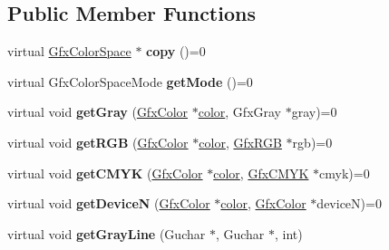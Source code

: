 \subsection*{Public Member Functions}
\begin{DoxyCompactItemize}
\item 
\mbox{\label{class_gfx_color_space_ab9b445e9acc594640393e17e27e4cf5c}} 
virtual \hyperlink{class_gfx_color_space}{Gfx\+Color\+Space} $\ast$ {\bfseries copy} ()=0
\item 
\mbox{\label{class_gfx_color_space_a4559405ac922360f73a0d06ce05ca623}} 
virtual Gfx\+Color\+Space\+Mode {\bfseries get\+Mode} ()=0
\item 
\mbox{\label{class_gfx_color_space_a76c3d1987b9328cfeeab349dfb8eddaa}} 
virtual void {\bfseries get\+Gray} (\hyperlink{struct_gfx_color}{Gfx\+Color} $\ast$\hyperlink{structcolor}{color}, Gfx\+Gray $\ast$gray)=0
\item 
\mbox{\label{class_gfx_color_space_a75622e2b5bdc720d5a13af5abeb9d93a}} 
virtual void {\bfseries get\+R\+GB} (\hyperlink{struct_gfx_color}{Gfx\+Color} $\ast$\hyperlink{structcolor}{color}, \hyperlink{struct_gfx_r_g_b}{Gfx\+R\+GB} $\ast$rgb)=0
\item 
\mbox{\label{class_gfx_color_space_af7bf579a6b33d40f3581224a32358c1a}} 
virtual void {\bfseries get\+C\+M\+YK} (\hyperlink{struct_gfx_color}{Gfx\+Color} $\ast$\hyperlink{structcolor}{color}, \hyperlink{struct_gfx_c_m_y_k}{Gfx\+C\+M\+YK} $\ast$cmyk)=0
\item 
\mbox{\label{class_gfx_color_space_a4fe08463045871f547c67e0ba6a26ceb}} 
virtual void {\bfseries get\+DeviceN} (\hyperlink{struct_gfx_color}{Gfx\+Color} $\ast$\hyperlink{structcolor}{color}, \hyperlink{struct_gfx_color}{Gfx\+Color} $\ast$deviceN)=0
\item 
\mbox{\label{class_gfx_color_space_acfdfc1b540710b4c27c5694fd4379724}} 
virtual void {\bfseries get\+Gray\+Line} (Guchar $\ast$, Guchar $\ast$, int)
\item 
\mbox{\label{class_gfx_color_space_a733db66f1648133353926534f6df9a4b}} 

\end{DoxyCompactItemize}
